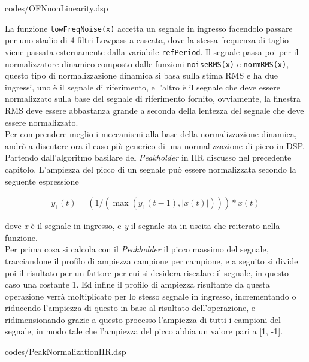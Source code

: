 \vspace{0.5cm} 

{codes/OFNnonLinearity.dsp}

La funzione \verb|lowFreqNoise(x)| accetta un segnale in ingresso
facendolo passare per uno stadio di 4 filtri Lowpass a cascata,
dove la stessa frequenza di taglio viene passata esternamente 
dalla variabile \verb|refPeriod|.
Il segnale passa poi per il normalizzatore dinamico composto dalle funzioni
\verb|noiseRMS(x)| e \verb|normRMS(x)|,
questo tipo di normalizzazione dinamica si basa sulla stima RMS e ha due ingressi,
uno è il segnale di riferimento, e l'altro è il segnale che deve essere normalizzato sulla base
del segnale di riferimento fornito, ovviamente,
la finestra RMS deve essere abbastanza grande a seconda della lentezza del
segnale che deve essere normalizzato.\\ 
Per comprendere meglio i meccanismi alla base
della normalizzazione dinamica,
andrò a discutere ora il caso più generico
di una normalizzazione di picco in DSP. \\
Partendo dall'algoritmo basilare del \textit{Peakholder} in IIR discusso nel precedente capitolo. 
L'ampiezza del picco di un segnale può essere normalizzata secondo la seguente espressione 

\begin{align*}
    y_{1}(t) = (1/(\max\left( y_{1}(t\!-\!1), \left\lvert{x(t)}\right\rvert \right))) * x(t) 
\end{align*}

dove \textit{x} è il segnale in ingresso, e \textit{y} il segnale sia in uscita che reiterato nella funzione. \\
Per prima cosa si calcola con il \textit{Peakholder} il picco massimo del segnale,
tracciandone il profilo di ampiezza campione per campione,
e a seguito si divide poi il risultato per 
un fattore per cui si desidera riscalare il segnale, in questo caso una costante 1.
Ed infine il profilo di ampiezza risultante da questa operazione verrà moltiplicato 
per lo stesso segnale in ingresso, incrementando o riducendo l'ampiezza di questo in base al risultato dell'operazione, 
e ridimensionando grazie a questo processo l'ampiezza di tutti i campioni del segnale, 
in modo tale che l'ampiezza del picco abbia un valore pari a [1, -1].

\vspace{0.5cm} 

{codes/PeakNormalizationIIR.dsp}

